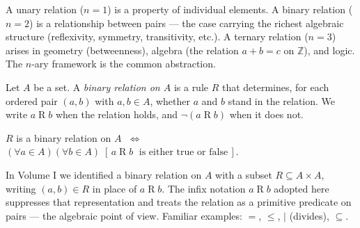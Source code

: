 \begin{remark}
A unary relation ($n = 1$) is a property of individual elements.
A binary relation ($n = 2$) is a relationship between pairs — the case
carrying the richest algebraic structure (reflexivity, symmetry, transitivity, etc.).
A ternary relation ($n = 3$) arises in geometry (betweenness), algebra
(the relation $a + b = c$ on $\mathbb{Z}$), and logic.
The $n$-ary framework is the common abstraction.
\end{remark}


\begin{tcolorbox}[colback=propbox, colframe=propborder, arc=2pt,
  left=6pt, right=6pt, top=4pt, bottom=4pt,
  title={\small\textbf{Definition (Binary Relation on a Set)}},
  fonttitle=\small\bfseries]
\label{def:binary-relation}
Let $A$ be a set.
A \emph{binary relation on $A$} is a rule $R$ that determines,
for each ordered pair $(a, b)$ with $a, b \in A$, whether
$a$ and $b$ stand in the relation.
We write $a \mathrel{R} b$ when the relation holds, and
$\lnot(a \mathrel{R} b)$ when it does not.
\end{tcolorbox}

\begin{remark}
$R$ is a binary relation on $A$
$\;\iff\;$
$(\forall a \in A)(\forall b \in A)\;
[\,a \mathrel{R} b \;\text{ is either true or false}\,]$.
\end{remark}

\begin{remark}
In Volume I we identified a binary relation on $A$ with a subset
$R \subseteq A \times A$, writing $(a,b) \in R$ in place of
$a \mathrel{R} b$.
The infix notation $a \mathrel{R} b$ adopted here suppresses that
representation and treats the relation as a primitive predicate on
pairs — the algebraic point of view.
Familiar examples: $=$, $\leq$, $\mid$ (divides), $\subseteq$.
\end{remark}


